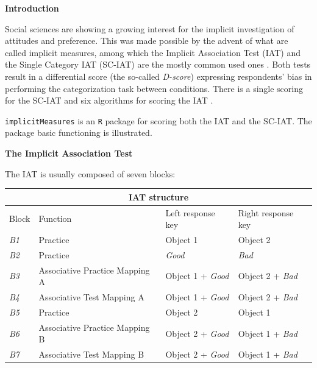 \documentclass[a0,landscape]{a0poster}
\begin{document}
\begin{multicols*}{3}

\begin{center}
	\huge \textbf{\textcolor{title}{Introduction}}
\end{center}

\vspace{5mm}
\large

Social sciences are showing a growing interest for the implicit investigation of attitudes and preference. This was made possible by the advent of what are called implicit measures, among which the Implicit Association Test (IAT) \cite{Greenwald1998} and the Single Category IAT (SC-IAT) \cite{karpinski2006} are the mostly common used ones \cite{review}.
Both tests result in a differential score (the so-called \emph{D-score}) expressing respondents’ bias in performing the categorization task between conditions. There is a single scoring for the SC-IAT \cite{karpinski2006} and six algorithms for scoring the IAT \cite{Greenwald2003}.

\texttt{implicitMeasures} is an \texttt{R} package for scoring both the IAT and the SC-IAT. The package basic functioning is illustrated. 


\begin{center}
	\Large \textbf{\textcolor{title}{The Implicit Association Test}}
\end{center}

The IAT is usually composed of seven blocks:

\begin{center}
	\begin{tabular}{llll}
		\multicolumn{4}{c}{IAT structure \label{tab:iat}}\\
		\toprule
		Block & Function & Left response key & Right response key  \\
		\midrule
		\emph{B1} & Practice & Object 1 & Object 2 \\
		\emph{B2} & Practice & \emph{Good} & \emph{Bad} \\
		\textcolor{comp}{\emph{B3}} & \textcolor{comp}{Associative Practice Mapping A} & \textcolor{comp}{Object 1 + \emph{Good}} & \textcolor{comp}{Object 2 + \emph{Bad}} \\
		\textcolor{comp}{\emph{B4} } & \textcolor{comp}{Associative Test Mapping A} & \textcolor{comp}{Object 1 + \emph{Good}} & \textcolor{comp}{Object 2 + \emph{Bad}} \\
		\emph{B5} & Practice & Object 2 & Object 1 \\
		\textcolor{inc}{\emph{B6}} & \textcolor{inc}{Associative Practice Mapping B} & \textcolor{inc}{Object 2 + \emph{Good}} & \textcolor{inc}{Object 1 + \emph{Bad}} \\
		\textcolor{inc}{\emph{B7}} & \textcolor{inc}{Associative Test Mapping B} & \textcolor{inc}{Object 2 + \emph{Good}} & \textcolor{inc}{Object 1 + \emph{Bad} }\\
		\bottomrule
	\end{tabular}
\end{center}


\end{multicols*}
\end{document}
